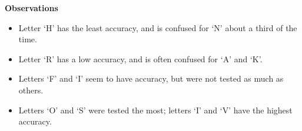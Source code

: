 \textbf{Observations}
\begin{itemize}
	\item Letter `H' has the least accuracy, and is confused for `N' about a third of the time.
	\item Letter `R' has a low accuracy, and is often confused for `A' and `K'.
	\item Letters `F' and `I' seem to have accuracy, but were not tested as much as others.
	\item Letters `O' and `S' were tested the most; letters `I' and `V' have the highest accuracy.
\end{itemize}